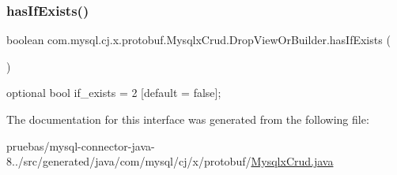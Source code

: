 \subsubsection{\texorpdfstring{has\+If\+Exists()}{hasIfExists()}}
{\footnotesize\ttfamily boolean com.\+mysql.\+cj.\+x.\+protobuf.\+Mysqlx\+Crud.\+Drop\+View\+Or\+Builder.\+has\+If\+Exists (\begin{DoxyParamCaption}{ }\end{DoxyParamCaption})}

{\ttfamily optional bool if\+\_\+exists = 2 \mbox{[}default = false\mbox{]};} 

The documentation for this interface was generated from the following file\+:\begin{DoxyCompactItemize}
\item 
pruebas/mysql-\/connector-\/java-\/8../src/generated/java/com/mysql/cj/x/protobuf/\mbox{\hyperlink{_mysqlx_crud_8java}{Mysqlx\+Crud.\+java}}\end{DoxyCompactItemize}
